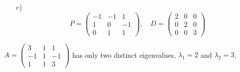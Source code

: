 {\begin{enumerate}
        A vector that is a basis for the eigenspace is $$v_3 = \begin{pmatrix} 1\\-1\\1\end{pmatrix}$$ But any non-zero multiple is also ok. 
        \item[c)] $$P = \begin{pmatrix} -1&-1&1\\1&0&-1\\0&1&1\end{pmatrix}, \quad D = \begin{pmatrix} 2&0&0\\0&2&0\\0&0&3\end{pmatrix}$$
    \end{enumerate}
    } 
   \fi
\fi 

\ifnum {}
    \question[3] $A = \begin{pmatrix}3&1&1\\-1&1&-1\\1&1&3 \end{pmatrix}$ has only two distinct eigenvalues, $\lambda_1 = 2$ and $\lambda_2 = 3$.   

